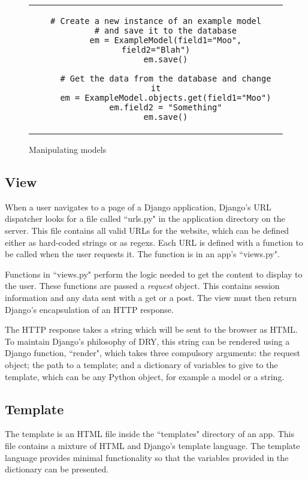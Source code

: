 \begin{figure}[thp]
	\centering
	\begin{tabular}{c}
	\begin{lstlisting}[label={lst:savemodel}]
	# Create a new instance of an example model
	# and save it to the database
	em = ExampleModel(field1="Moo", field2="Blah")
	em.save()
	
	# Get the data from the database and change it
	em = ExampleModel.objects.get(field1="Moo")
	em.field2 = "Something"
	em.save()
	\end{lstlisting}
	\end{tabular}
	\caption{Manipulating models}
\end{figure}

\subsection{View}
When a user navigates to a page of a Django application, Django's URL dispatcher looks for a file called ``urls.py" in the application directory on the server. This file contains all valid URLs for the website, which can be defined either as hard-coded strings or as \glspl{regex}. Each URL is defined with a function to be called when the user requests it. The function is in an app's ``views.py".

Functions in ``views.py" perform the logic needed to get the content to display to the user. These functions are passed a \emph{request} object. This contains \gls{session} information and any data sent with a \gls{get} or a \gls{post}. The view must then return Django's encapsulation of an \gls{HTTP} response.

The HTTP response takes a string which will be sent to the browser as HTML. To maintain Django's philosophy of \gls{DRY}, this string can be rendered using a Django function, ``render", which takes three compulsory arguments: the request object; the path to a template; and a dictionary of variables to give to the template, which can be any Python object, for example a model or a string.

\subsection{Template}
The template is an HTML file inside the ``templates" directory of an app. This file contains a mixture of HTML and Django's template language. The template language provides minimal functionality so that the variables provided in the dictionary can be presented.

